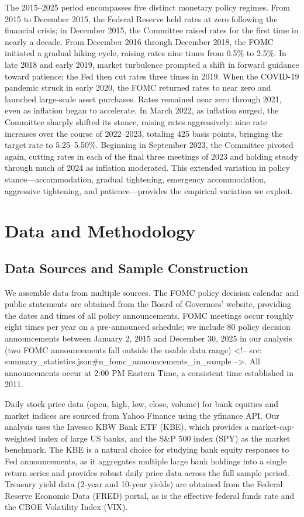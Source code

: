 \documentclass{article}
\begin{document}
The 2015--2025 period encompasses five distinct monetary policy regimes. From 2015 to December 2015, the Federal Reserve held rates at zero following the financial crisis; in December 2015, the Committee raised rates for the first time in nearly a decade. From December 2016 through December 2018, the FOMC initiated a gradual hiking cycle, raising rates nine times from 0.5\% to 2.5\%. In late 2018 and early 2019, market turbulence prompted a shift in forward guidance toward patience; the Fed then cut rates three times in 2019. When the COVID-19 pandemic struck in early 2020, the FOMC returned rates to near zero and launched large-scale asset purchases. Rates remained near zero through 2021, even as inflation began to accelerate. In March 2022, as inflation surged, the Committee sharply shifted its stance, raising rates aggressively: nine rate increases over the course of 2022--2023, totaling 425 basis points, bringing the target rate to 5.25--5.50\%. Beginning in September 2023, the Committee pivoted again, cutting rates in each of the final three meetings of 2023 and holding steady through much of 2024 as inflation moderated. This extended variation in policy stance—accommodation, gradual tightening, emergency accommodation, aggressive tightening, and patience—provides the empirical variation we exploit.

\section{Data and Methodology}

\subsection{Data Sources and Sample Construction}

We assemble data from multiple sources. The FOMC policy decision calendar and public statements are obtained from the Board of Governors' website, providing the dates and times of all policy announcements. FOMC meetings occur roughly eight times per year on a pre-announced schedule; we include 80 policy decision announcements between January 2, 2015 and December 30, 2025 in our analysis (two FOMC announcements fall outside the usable data range) <!-- src: summary_statistics.json#n_fomc_announcements_in_sample -->. All announcements occur at 2:00 PM Eastern Time, a consistent time established in 2011.

Daily stock price data (open, high, low, close, volume) for bank equities and market indices are sourced from Yahoo Finance using the yfinance API. Our analysis uses the Invesco KBW Bank ETF (KBE), which provides a market-cap-weighted index of large US banks, and the S&P 500 index (SPY) as the market benchmark. The KBE is a natural choice for studying bank equity responses to Fed announcements, as it aggregates multiple large bank holdings into a single return series and provides robust daily price data across the full sample period. Treasury yield data (2-year and 10-year yields) are obtained from the Federal Reserve Economic Data (FRED) portal, as is the effective federal funds rate and the CBOE Volatility Index (VIX).
\end{document}

